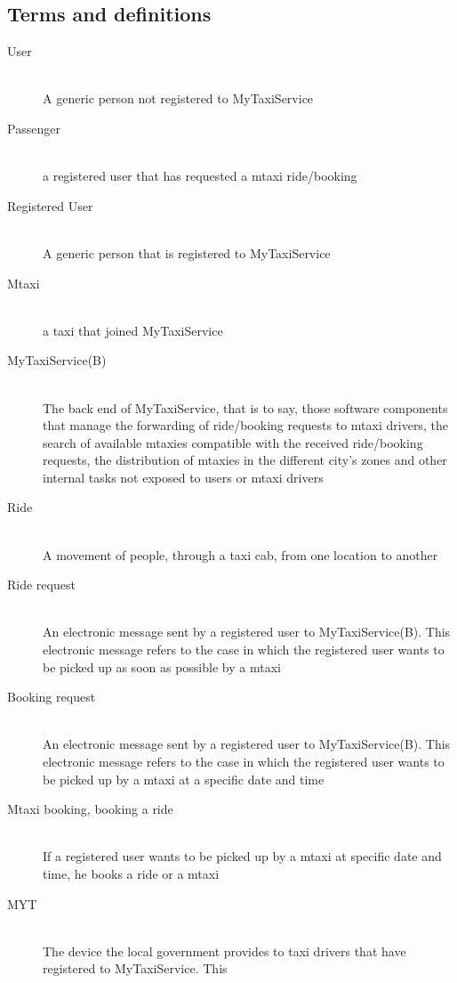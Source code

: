 \documentclass[11pt]{article} %
\begin{document}
  \subsection{Terms and definitions}
	\begin{description}
	      \item [User] \hfill \\A generic person not registered to MyTaxiService
	      \item [Passenger] \hfill \\ a registered user that has requested a mtaxi ride/booking
	      \item [Registered User] \hfill \\ A generic person that is registered to MyTaxiService
	      \item [Mtaxi] \hfill \\ a taxi that joined MyTaxiService
	      \item [MyTaxiService(B)] \hfill \\ The back end of MyTaxiService, that is to say, those software components
	        that manage the forwarding of ride/booking requests to mtaxi drivers, the search of available mtaxies compatible with the received ride/booking requests, the distribution
	        of mtaxies in the different city's zones and other internal tasks not exposed to users or mtaxi drivers
	      \item[Ride] \hfill \\ A movement of people, through a taxi cab, from one location to another
	      \item [Ride request] \hfill \\ An electronic message sent by a registered user
	        to MyTaxiService(B). This electronic message refers to the case in which the registered user wants to be picked up as soon as possible by a mtaxi
	      \item[Booking request]\hfill \\ An electronic message sent by a registered user
	         to MyTaxiService(B). This electronic message refers to the case in which the registered user wants to be picked up by a mtaxi at a specific date and time
	      \item[Mtaxi booking, booking a ride] \hfill\\If a registered user wants to be picked up by a mtaxi at specific date and time, he books a ride or a mtaxi
	      \item [MYT] \hfill \\The device the local government provides to taxi drivers that have registered to MyTaxiService. This

\end{description}
\end{document}
